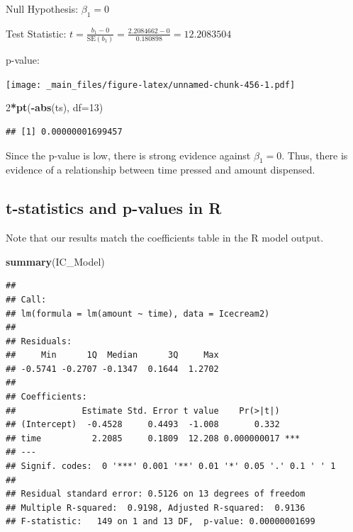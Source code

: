 \documentclass[]{book}
\newenvironment{Shaded}{\begin{snugshade}}{\end{snugshade}}
\newcommand{\KeywordTok}[1]{\textcolor[rgb]{0.13,0.29,0.53}{\textbf{#1}}}
\newcommand{\DataTypeTok}[1]{\textcolor[rgb]{0.13,0.29,0.53}{#1}}
\newcommand{\DecValTok}[1]{\textcolor[rgb]{0.00,0.00,0.81}{#1}}
\newcommand{\StringTok}[1]{\textcolor[rgb]{0.31,0.60,0.02}{#1}}
\newcommand{\OperatorTok}[1]{\textcolor[rgb]{0.81,0.36,0.00}{\textbf{#1}}}
\newcommand{\NormalTok}[1]{#1}
\begin{document}
Null Hypothesis: \(\beta_1=0\)

Test Statistic:
\(t=\frac{b_1-0}{\text{SE}(b_1)}=\frac{2.2084662 - 0 }{0.180898} = 12.2083504\)

p-value:

\begin{Shaded}
\end{Shaded}

\texttt{[image: \_main\_files/figure-latex/unnamed-chunk-456-1.pdf]}

\begin{Shaded}
\begin{Highlighting}[]
\DecValTok{2}\OperatorTok{*}\KeywordTok{pt}\NormalTok{(}\OperatorTok{-}\KeywordTok{abs}\NormalTok{(ts), }\DataTypeTok{df=}\DecValTok{13}\NormalTok{)}
\end{Highlighting}
\end{Shaded}

\begin{verbatim}
## [1] 0.00000001699457
\end{verbatim}

Since the p-value is low, there is strong evidence against
\(\beta_1=0\). Thus, there is evidence of a relationship between time
pressed and amount dispensed.

\subsection{t-statistics and p-values in
R}\label{t-statistics-and-p-values-in-r}

Note that our results match the coefficients table in the R model
output.

\begin{Shaded}
\begin{Highlighting}[]
\KeywordTok{summary}\NormalTok{(IC_Model)}
\end{Highlighting}
\end{Shaded}

\begin{verbatim}
## 
## Call:
## lm(formula = lm(amount ~ time), data = Icecream2)
## 
## Residuals:
##     Min      1Q  Median      3Q     Max 
## -0.5741 -0.2707 -0.1347  0.1644  1.2702 
## 
## Coefficients:
##             Estimate Std. Error t value    Pr(>|t|)    
## (Intercept)  -0.4528     0.4493  -1.008       0.332    
## time          2.2085     0.1809  12.208 0.000000017 ***
## ---
## Signif. codes:  0 '***' 0.001 '**' 0.01 '*' 0.05 '.' 0.1 ' ' 1
## 
## Residual standard error: 0.5126 on 13 degrees of freedom
## Multiple R-squared:  0.9198, Adjusted R-squared:  0.9136 
## F-statistic:   149 on 1 and 13 DF,  p-value: 0.00000001699
\end{verbatim}
\end{document}
